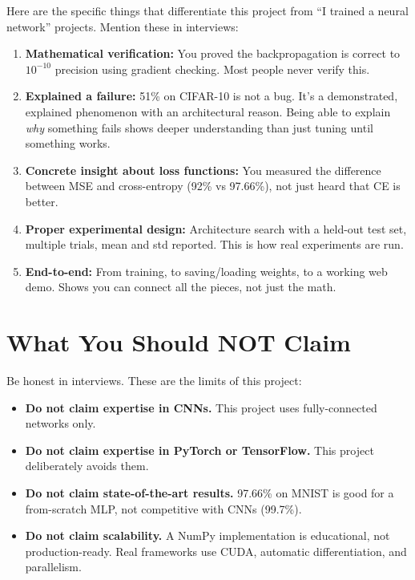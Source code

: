 \documentclass[12pt, a4paper]{article}
\begin{document}
Here are the specific things that differentiate this project from ``I trained a neural network'' projects. Mention these in interviews:

\begin{enumerate}
  \item \textbf{Mathematical verification:} You proved the backpropagation is correct to $10^{-10}$ precision using gradient checking. Most people never verify this.

  \item \textbf{Explained a failure:} 51\% on CIFAR-10 is not a bug. It's a demonstrated, explained phenomenon with an architectural reason. Being able to explain \textit{why} something fails shows deeper understanding than just tuning until something works.

  \item \textbf{Concrete insight about loss functions:} You measured the difference between MSE and cross-entropy (92\% vs 97.66\%), not just heard that CE is better.

  \item \textbf{Proper experimental design:} Architecture search with a held-out test set, multiple trials, mean and std reported. This is how real experiments are run.

  \item \textbf{End-to-end:} From training, to saving/loading weights, to a working web demo. Shows you can connect all the pieces, not just the math.
\end{enumerate}

\section{What You Should NOT Claim}

Be honest in interviews. These are the limits of this project:

\begin{itemize}
  \item \textbf{Do not claim expertise in CNNs.} This project uses fully-connected networks only.
  \item \textbf{Do not claim expertise in PyTorch or TensorFlow.} This project deliberately avoids them.
  \item \textbf{Do not claim state-of-the-art results.} 97.66\% on MNIST is good for a from-scratch MLP, not competitive with CNNs (99.7\%).
  \item \textbf{Do not claim scalability.} A NumPy implementation is educational, not production-ready. Real frameworks use CUDA, automatic differentiation, and parallelism.
\end{itemize}
\end{document}
